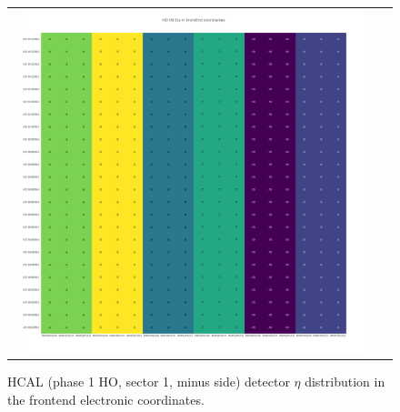 \begin{figure}[htb]
 \begin{center}
  \begin{tabular}{cc}
   \includegraphics[angle=0,width=0.95\textwidth]{figures/appendix/HO1M_Eta_in_FrontEnd.png}
  \end{tabular}
  \caption{HCAL (phase 1 HO, sector 1, minus side) detector $\eta$ distribution in the frontend electronic coordinates.}
  \label{fig:lmapHO1MEtaFEC}
 \end{center}
\end{figure}
\clearpage

